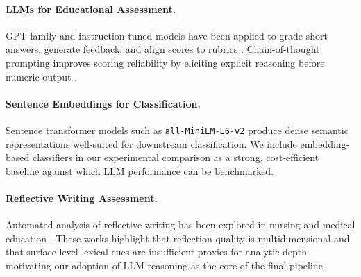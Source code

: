 \documentclass[11pt]{article}
\begin{document}
\paragraph{LLMs for Educational Assessment.}
GPT-family and instruction-tuned models have been applied to grade short answers, generate feedback, and align scores to rubrics \citep{kortemeyer2023could, mizumoto2023exploring}. Chain-of-thought prompting improves scoring reliability by eliciting explicit reasoning before numeric output \citep{wei2022chain}.

\paragraph{Sentence Embeddings for Classification.}
Sentence transformer models such as \texttt{all-MiniLM-L6-v2} \citep{reimers2019sentence} produce dense semantic representations well-suited for downstream classification. We include embedding-based classifiers in our experimental comparison as a strong, cost-efficient baseline against which LLM performance can be benchmarked.


\paragraph{Reflective Writing Assessment.}
Automated analysis of reflective writing has been explored in nursing \citep{song2022automated} and medical education \citep{kennedy2014reflection}. These works highlight that reflection quality is multidimensional and that surface-level lexical cues are insufficient proxies for analytic depth—motivating our adoption of LLM reasoning as the core of the final pipeline.

\end{document}
